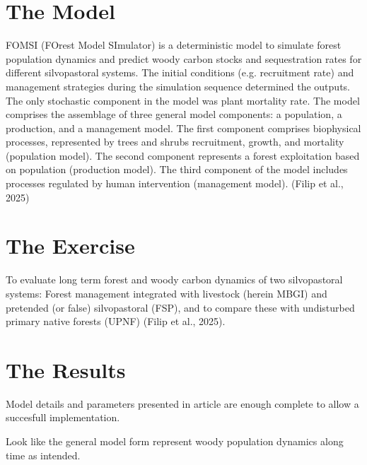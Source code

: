 \documentclass[11pt,a4paper,numbers=enddot]{scrartcl}
\begin{document}
\title{\color{myblue}{SmplSimWoody 1.0}}
\subtitle{\color{myblue}{A Light FOMSI Simulator}}

\author{Héctor S. Enrique}
\date{ feb 10, 2026}
\maketitle

\section{The Model}

    FOMSI (FOrest Model SImulator) is a deterministic model to simulate forest population dynamics and predict woody carbon stocks and sequestration rates for different silvopastoral systems. The initial conditions (e.g. recruitment rate) and management strategies during the simulation sequence determined the outputs. The only stochastic component in the model was plant mortality rate. The model comprises the assemblage of three general model components: a population, a production, and a management model. The first component comprises biophysical processes, represented by trees and shrubs recruitment, growth, and mortality (population model). The second component represents a forest exploitation based on population (production model). The third component of the model includes processes regulated by human intervention (management model). (Filip et al., 2025)



\section{The Exercise }

To evaluate long term forest and woody carbon dynamics of two silvopastoral systems: Forest management integrated with livestock (herein MBGI) and pretended (or false) silvopastoral (FSP), and to compare these with undisturbed primary native forests (UPNF) (Filip et al., 2025).

\section {The Results}

	Model details and parameters presented in article are enough complete to allow a succesfull implementation.
   
   Look like the general model form represent woody population dynamics along time as intended.
\end{document}
